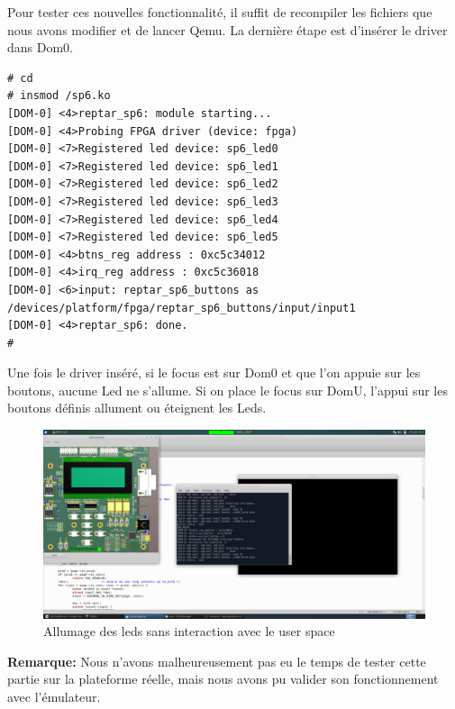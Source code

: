 Pour tester ces nouvelles fonctionnalité, il suffit de recompiler les fichiers que nous avons modifier et de lancer Qemu. La dernière étape est d'insérer le driver dans Dom0.
\begin{lstlisting}
# cd
# insmod /sp6.ko 
[DOM-0] <4>reptar_sp6: module starting...
[DOM-0] <4>Probing FPGA driver (device: fpga)
[DOM-0] <7>Registered led device: sp6_led0
[DOM-0] <7>Registered led device: sp6_led1
[DOM-0] <7>Registered led device: sp6_led2
[DOM-0] <7>Registered led device: sp6_led3
[DOM-0] <7>Registered led device: sp6_led4
[DOM-0] <7>Registered led device: sp6_led5
[DOM-0] <4>btns_reg address : 0xc5c34012
[DOM-0] <4>irq_reg address : 0xc5c36018
[DOM-0] <6>input: reptar_sp6_buttons as /devices/platform/fpga/reptar_sp6_buttons/input/input1
[DOM-0] <4>reptar_sp6: done.
# 
\end{lstlisting}
Une fois le driver inséré, si le focus est sur Dom0 et que l'on appuie sur les boutons, aucune Led ne s'allume. Si on place le focus sur DomU, l'appui sur les boutons définis allument ou éteignent les Leds.
\begin{figure}[H]
	\begin{center}
		\includegraphics[width=17cm]{img/dom06.png}
		\caption{Allumage des leds sans interaction avec le user space}
		\label{dom06}
	\end{center}
\end{figure}
\textbf{Remarque: }Nous n'avons malheureusement pas eu le temps de tester cette partie sur la plateforme réelle, mais nous avons pu valider son fonctionnement avec l'émulateur.